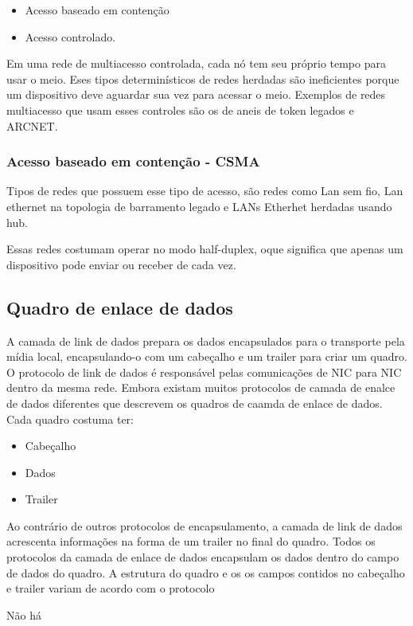 \documentclass[12pt a4paper]{paper}
\begin{document}
\begin{itemize}
  \item Acesso baseado em contenção 
  \item Acesso controlado.
\end{itemize}  
Em uma rede de multiacesso controlada, cada nó tem seu 
próprio tempo para usar o meio. Eses tipos determinísticos 
de redes herdadas são ineficientes porque um dispositivo 
deve aguardar sua vez para acessar o meio. Exemplos de 
redes multiacesso que usam esses controles são os de 
aneis de token legados e ARCNET.

\subsubsection{Acesso baseado em contenção - CSMA} %
\label{sec:Acesso baseado em contenção - CSMA}
Tipos de redes que possuem esse tipo de acesso, são 
redes como Lan sem fio, Lan ethernet na topologia de 
barramento legado e LANs Etherhet herdadas usando hub. 

Essas redes costumam operar no modo half-duplex, oque 
significa que apenas um dispositivo pode enviar ou receber
de cada vez. 

\subsection{Quadro de enlace de dados} %
\label{sub:Quadro de enlace de dados}
A camada de link de dados prepara os dados encapsulados para
o transporte pela mídia local, encapsulando-o com um 
cabeçalho e um trailer para criar um quadro. O protocolo de 
link de dados é responsável pelas comunicações de NIC para 
NIC dentro da mesma rede. Embora existam muitos protocolos
de camada de enalce de dados diferentes que descrevem os 
quadros de caamda de enlace de dados. Cada quadro costuma 
ter: 

\begin{itemize}
  \item Cabeçalho
  \item Dados
  \item Trailer
\end{itemize}

Ao contrário de outros protocolos de encapsulamento, a 
camada de link de dados acrescenta informações na forma 
de um trailer no final do quadro. Todos os protocolos 
da camada de enlace de dados encapsulam os dados dentro do
campo de dados do quadro. A estrutura do quadro e os 
os campos contidos no cabeçalho e trailer variam de 
acordo com o protocolo

Não há



\end{document}
